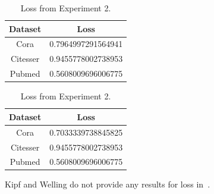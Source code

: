 \begin {table}[ht]
\parbox{.45\linewidth}{
\begin{center}
  \begin{tabular}{|c|c|}
  \hline
  Dataset       &  Loss\\ \hline
  Cora          & 0.7964997291564941 \\ 
  Citesser      & 0.9455778002738953 \\
  Pubmed        & 0.5608009696006775 \\
  \hline
  \end{tabular}
\end{center}
\caption {Loss from Experiment 1.} \label{tab:loss1} 
}
\hfill
\parbox{.45\linewidth}{
\begin{center}
  \begin{tabular}{|c|c|}
  \hline
  Dataset       &  Loss\\ \hline
  Cora          & 0.7033339738845825 \\ 
  Citesser      & 0.9455778002738953 \\
  Pubmed        & 0.5608009696006775 \\
  \hline
  \end{tabular}
\end{center}
\caption {Loss from Experiment 2.} \label{tab:loss2} 
}
\end{table}

Kipf and Welling do not provide any results for loss in~\cite{Kipf2016}.